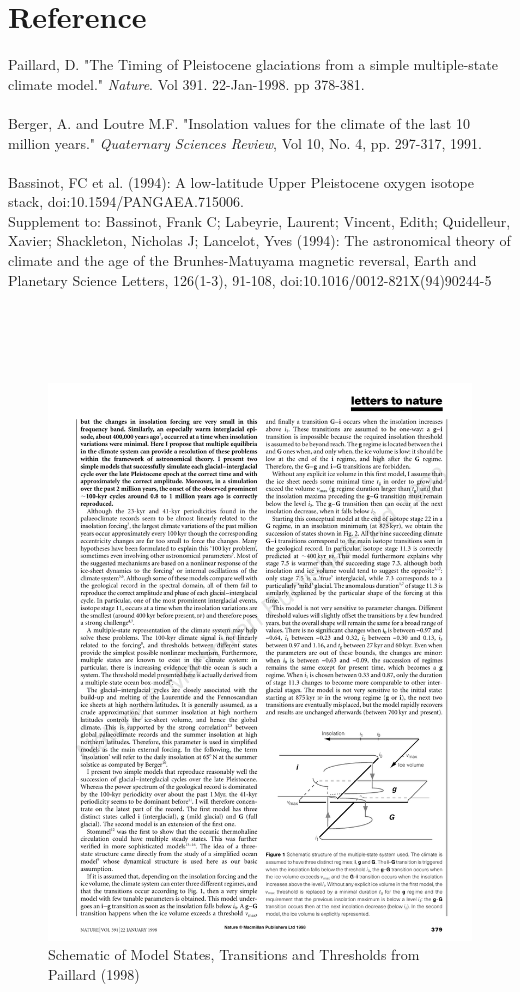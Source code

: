 \documentclass[11pt]{amsart}
\begin{document}
\section{Reference}
\noindent Paillard, D. "The Timing of Pleistocene glaciations from a simple multiple-state climate model." \emph{Nature}.  Vol 391.  22-Jan-1998.  pp 378-381.\\
\\
\noindent Berger, A. and Loutre M.F.  "Insolation values for the climate of the last 10 million years."  \emph{Quaternary Sciences Review}, Vol 10, No. 4, pp. 297-317, 1991.\\
\\
\noindent Bassinot, FC et al. (1994): A low-latitude Upper Pleistocene oxygen isotope stack, doi:10.1594/PANGAEA.715006.\\
\indent Supplement to: Bassinot, Frank C; Labeyrie, Laurent; Vincent, Edith; Quidelleur, Xavier; Shackleton, Nicholas J; Lancelot, Yves (1994): The astronomical theory of climate and the age of the Brunhes-Matuyama magnetic reversal, Earth and Planetary Science Letters, 126(1-3), 91-108, doi:10.1016/0012-821X(94)90244-5
\\ \\ \\ \\ \\
\begin{figure}[h]
\includegraphics[scale=1.0]{paillard_model_cartoon.pdf}
\caption{Schematic of Model States, Transitions and Thresholds from Paillard (1998)}
\end{figure}
\end{document}
